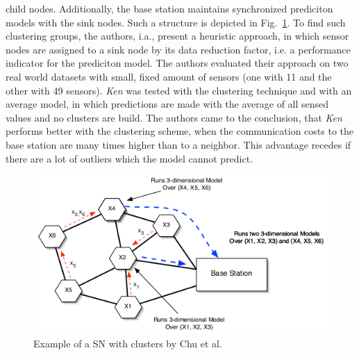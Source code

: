 child nodes. Additionally, the base station maintains synchronized prediciton
models with the sink nodes. Such a structure is depicted in
Fig.~\ref{fig:cluster Chu}. To find such clustering groups, the authors, i.a.,
present a heuristic approach, in which sensor nodes are assigned to a sink node
by its data reduction factor, i.e. a performance indicator for the prediciton
model. The authors evaluated their approach on two real world datasets with
small, fixed amount of sensors (one with 11 and the other with 49 sensors).
\textit{Ken} was tested with the clustering technique and with an average
model, in which predictions are made with the average of all sensed values and
no clusters are build. The authors came to the conclusion, that \textit{Ken}
performs better with the clustering scheme, when the communication costs to the
base station are many times higher than to a neighbor. This advantage recedes if
there are a lot of outliers which the model cannot predict.

\begin{figure}[h]
\includegraphics[width=\linewidth]{images/ken-clustering.png}
\caption{Example of a \ac{SN} with clusters by Chu et al.~\cite{chu2006approximate}}
\label{fig:cluster Chu}
\centering
\end{figure}

